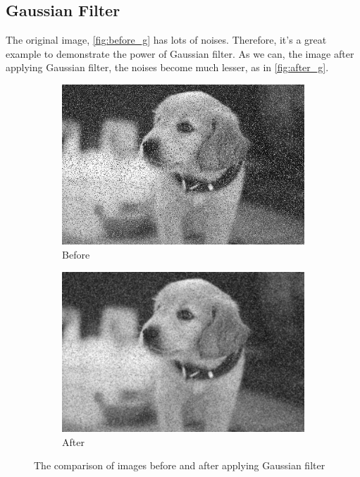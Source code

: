 \documentclass[twocolumn]{extarticle}
\begin{document}
\subsection{Gaussian Filter}

The original image, \autoref{fig:before_g} has lots of noises. Therefore, it's a great example to demonstrate the power of Gaussian filter. As we can, the image after applying Gaussian filter, the noises become much lesser, as in \autoref{fig:after_g}.


\begin{figure}[H]
     \centering
     \begin{subfigure}[b]{0.45\linewidth}
         \centering
         \includegraphics[width=\textwidth]{figure/Q3}
         \caption{Before}
         \label{fig:before_g}
     \end{subfigure}
     \hfill
     \begin{subfigure}[b]{0.45\linewidth}
         \centering
         \includegraphics[width=\textwidth]{figure/Q3_gaussian}
         \caption{After}
         \label{fig:after_g}
     \end{subfigure}
        \caption{The comparison of images before and after applying Gaussian filter}
        \label{fig:three graphs}
\end{figure}
\end{document}
